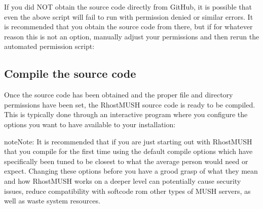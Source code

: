 \documentclass[letterpaper,10pt,english]{sphinxmanual}
\begin{document}
\sphinxAtStartPar
If you did NOT obtain the source code directly from GitHub, it is possible that
even the above script will fail to run with \textquotesingle{}permission denied\textquotesingle{} or similar
errors. It is recommended that you obtain the source code from there, but if
for whatever reason this is not an option, manually adjust your permissions
and then re\sphinxhyphen{}run the automated permission script:

\begin{sphinxVerbatim}[commandchars=\\\{\}]
      
\end{sphinxVerbatim}


\subsection{Compile the source code}
\label{\detokenize{install:compile-the-source-code}}
\sphinxAtStartPar
Once the source code has been obtained and the proper file and directory
permissions have been set, the RhostMUSH source code is ready to be compiled.
This is typically done through an interactive program where you configure the
options you want to have available to your installation:

\begin{sphinxVerbatim}[commandchars=\\\{\}]
 
\end{sphinxVerbatim}

\begin{sphinxadmonition}{note}{Note:}
\sphinxAtStartPar
It is recommended that if you are just starting out with RhostMUSH that you
compile for the first time using the default compile options which have
specifically been tuned to be closest to what the average person would need
or expect. Changing these options before you have a grood grasp of what
they mean and how RhostMUSH works on a deeper level can potentially cause
security issues, reduce compatibility with softcode rom other types of MUSH
servers, as well as waste system resources.
\end{sphinxadmonition}
\end{document}
